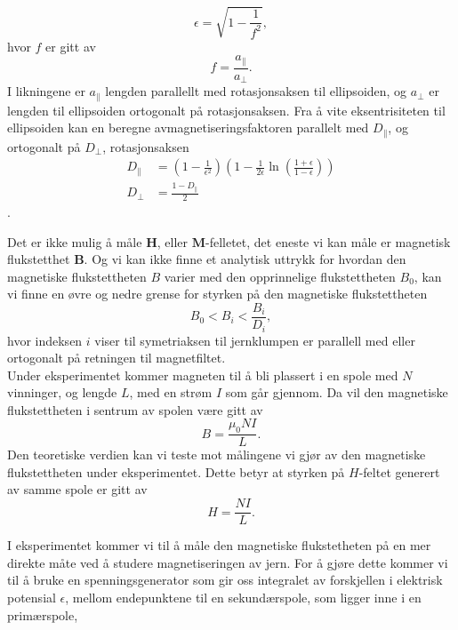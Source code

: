 \documentclass[%
 reprint,
 amsmath,amssymb,
 aps,
 norsk,
]{revtex4-1}
\begin{document}
\begin{equation}
  \epsilon = \sqrt{1-\frac{1}{f^2}},\label{eksent}
\end{equation}
hvor $f$ er gitt av
\begin{equation}
  f = \frac{a_{\parallel}}{a_{\perp}}.
\end{equation}
I likningene er $a_{\parallel}$ lengden parallellt med rotasjonsaksen til ellipsoiden, og $a_{\perp}$ er lengden til ellipsoiden ortogonalt på rotasjonsaksen. Fra å vite eksentrisiteten til ellipsoiden kan en beregne avmagnetiseringsfaktoren parallelt med $D_{\parallel}$, og ortogonalt på $D_{\perp}$, rotasjonsaksen
\begin{align}
  D_{\parallel} &= \left(1-\frac{1}{\epsilon^2}\right)\left(1-\frac{1}{2\epsilon}\ln{\left(\frac{1+\epsilon}{1-\epsilon}\right)} \right) \\
  D_{\perp} &= \frac{1-D_{\parallel}}{2}
\end{align}.
\par
Det er ikke mulig å måle $\bm{H}$, eller $\bm{M}$-felletet, det eneste vi kan måle er magnetisk flukstetthet $\bm{B}$. Og vi kan ikke finne et analytisk uttrykk for hvordan den magnetiske flukstettheten $B$ varier med den opprinnelige flukstettheten $B_0$, kan vi finne en øvre og nedre grense for styrken på den magnetiske flukstettheten
\begin{equation}
  B_0 < B_i < \frac{B_i}{D_i}, \label{upper_limit}
\end{equation}
hvor indeksen $i$ viser til symetriaksen til jernklumpen er parallell med eller ortogonalt på retningen til magnetfiltet.
\\Under eksperimentet kommer magneten til å bli plassert i en spole med $N$ vinninger, og lengde $L$, med en strøm $I$ som går gjennom. Da vil den magnetiske flukstettheten i sentrum av spolen være gitt av
\begin{equation}
  B = \frac{\mu_0NI}{L}. \label{nice_b}
\end{equation}Den teoretiske verdien kan vi teste mot målingene vi gjør av den magnetiske flukstettheten under eksperimentet. Dette betyr at styrken på $H$-feltet generert av samme spole er gitt av
\begin{equation}
  H = \frac{NI}{L}. \label{nice_H}
\end{equation}
\par
I eksperimentet kommer vi til å måle den magnetiske flukstetheten på en mer direkte måte ved å studere magnetiseringen av jern. For å gjøre dette kommer vi til å bruke en spenningsgenerator som gir oss integralet av forskjellen i elektrisk potensial $\epsilon$, mellom endepunktene til en sekundærspole, som ligger inne i en primærspole,
\end{document}
